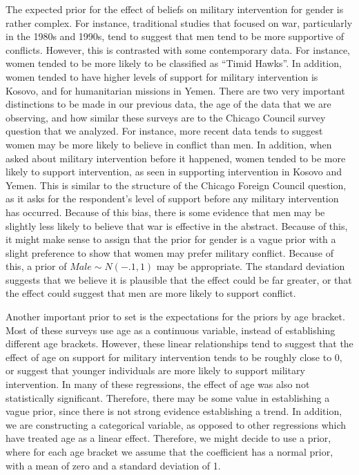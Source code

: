 \documentclass[
  11pt,
]{article}
\begin{document}
The expected prior for the effect of beliefs on military intervention
for gender is rather complex. For instance, traditional studies that
focused on war, particularly in the 1980s and 1990s, tend to suggest
that men tend to be more supportive of conflicts. However, this is
contrasted with some contemporary data. For instance, women tended to be
more likely to be classified as ``Timid Hawks''. In addition, women
tended to have higher levels of support for military intervention is
Kosovo, and for humanitarian missions in Yemen. There are two very
important distinctions to be made in our previous data, the age of the
data that we are observing, and how similar these surveys are to the
Chicago Council survey question that we analyzed. For instance, more
recent data tends to suggest women may be more likely to believe in
conflict than men. In addition, when asked about military intervention
before it happened, women tended to be more likely to support
intervention, as seen in supporting intervention in Kosovo and Yemen.
This is similar to the structure of the Chicago Foreign Council
question, as it asks for the respondent's level of support before any
military intervention has occurred. Because of this bias, there is some
evidence that men may be slightly less likely to believe that war is
effective in the abstract. Because of this, it might make sense to
assign that the prior for gender is a vague prior with a slight
preference to show that women may prefer military conflict. Because of
this, a prior of \(Male\sim N(-.1,1)\) may be appropriate. The standard
deviation suggests that we believe it is plausible that the effect could
be far greater, or that the effect could suggest that men are more
likely to support conflict.

Another important prior to set is the expectations for the priors by age
bracket. Most of these surveys use age as a continuous variable, instead
of establishing different age brackets. However, these linear
relationships tend to suggest that the effect of age on support for
military intervention tends to be roughly close to 0, or suggest that
younger individuals are more likely to support military intervention. In
many of these regressions, the effect of age was also not statistically
significant. Therefore, there may be some value in establishing a vague
prior, since there is not strong evidence establishing a trend. In
addition, we are constructing a categorical variable, as opposed to
other regressions which have treated age as a linear effect. Therefore,
we might decide to use a prior, where for each age bracket we assume
that the coefficient has a normal prior, with a mean of zero and a
standard deviation of 1.
\end{document}
